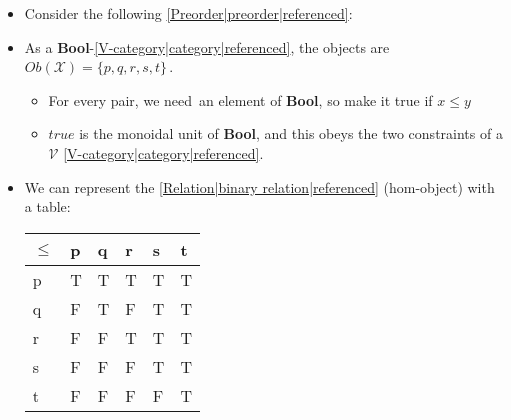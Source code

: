 
\begin{itemize}
    \item  Consider the following \ref{Preorder|preorder|referenced}: 
    \item As a \textbf{Bool}-\ref{V-category|category|referenced}, the objects are \,$Ob(\mathcal{X})=\{p,q,r,s,t\}$\,.
          \begin{itemize}
            \item For every pair, we need \,an element of \textbf{Bool}, so make it true if $x\leq y$\,
            \item $true$ is the monoidal unit of \textbf{Bool}, and this obeys the two constraints of a $\mathcal{V}$ \ref{V-category|category|referenced}.
          \end{itemize}
    \item We can represent the \ref{Relation|binary relation|referenced} (hom-object) with a table:\,
          \begin{minipage}{0.48\textwidth}
            \begin{tabular}{|l|l|l|l|l|l|}
              $\leq$ & p & q & r & s & t \\  \hline
              p      & T & T & T & T & T \\ \hline
              q      & F & T & F & T & T \\ \hline
              r      & F & F & T & T & T \\ \hline
              s      & F & F & F & T & T \\ \hline
              t      & F & F & F & F & T
            \end{tabular}
          \end{minipage}\,
  \end{itemize}